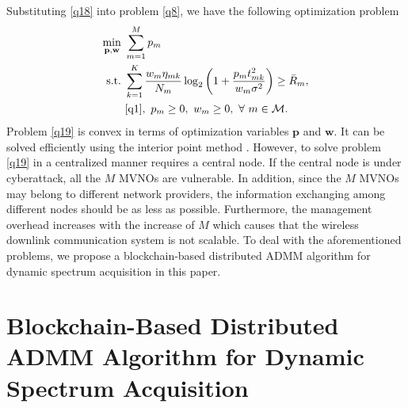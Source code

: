 \documentclass[journal]{IEEEtran}
\begin{document}
Substituting \eqref{q18} into problem \eqref{q8}, we have the following optimization problem
\begin{align}\label{q19}
\min_{\mathbf{p}, \mathbf{w}}\ & \sum\limits_{m=1}^{M} p_m \nonumber\\
\mbox{s.t.}\ &\sum\limits_{k= 1}^{K}\frac{w_m \eta_{mk}}{N_m}\log_2\left(1 + \frac{p_mt_{mk}^2}{w_m\sigma^2}\right)\geq \bar{R}_m,\nonumber\\
&\eqref{q1},\ p_m \geq 0,\ w_m \geq 0,\ \forall\ m\in\mathcal{M}.
\end{align}
Problem \eqref{q19} is convex in terms of optimization variables $\mathbf{p}$ and $\mathbf{w}$. It can be solved efficiently using the interior point method \cite{SBoyd1}. However, to solve problem \eqref{q19} in a centralized manner requires a central node. If the central node is under cyberattack, all the $M$ MVNOs are vulnerable. In addition, since the $M$ MVNOs may belong to different network providers, the information exchanging among different nodes should be as less as possible. Furthermore, the management overhead increases with the increase of $M$ which causes that the wireless downlink communication system is not scalable. To deal with the aforementioned problems, we propose a blockchain-based distributed ADMM algorithm \cite{SBoyd2,EChen} for dynamic spectrum acquisition in this paper.

\section{Blockchain-Based Distributed ADMM Algorithm for Dynamic Spectrum Acquisition}
\end{document}
